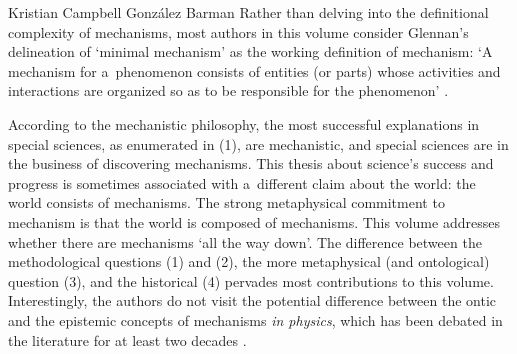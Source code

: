 \begin{recengenv}{Kristian Campbell González Barman}
Rather than delving into the definitional complexity of mechanisms, most authors in this volume consider Glennan's delineation of ‘minimal mechanism' as the working definition of mechanism: ‘A mechanism for a~phenomenon consists of entities (or parts) whose activities and interactions are organized so as to be responsible for the phenomenon'
\parencite[][p.17]{illari_routledge_2017}.%


According to the mechanistic philosophy, the most successful explanations in special sciences, as enumerated in (1), are mechanistic, and special sciences are in the business of discovering mechanisms. This thesis about science's success and progress is sometimes associated with a~different claim about the world: the world consists of mechanisms. The strong metaphysical commitment to mechanism is that the world is composed of mechanisms. This volume addresses whether there are mechanisms ‘all the way down'. The difference between the methodological questions (1) and (2), the more metaphysical (and ontological) question (3), and the historical (4) pervades most contributions to this volume. Interestingly, the authors do not visit the potential difference between the ontic and the epistemic concepts of mechanisms \textit{in physics}, which has been debated in the literature for at least two decades
\parencites{salmon_scientific_1984}{glennan_rethinking_2002}{wright_mechanistic_2012}{illari_mechanistic_2013}.


\end{recengenv}
